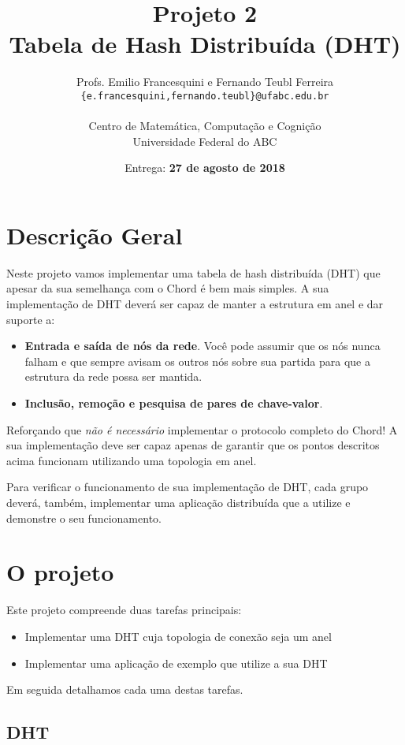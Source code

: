 \documentclass[oneside,12pt,a4paper]{article}
\title{Projeto 2\\ Tabela de Hash Distribuída (DHT)}
\author{Profs. Emilio Francesquini e Fernando Teubl Ferreira\\
  \texttt{\{e.francesquini,fernando.teubl\}@ufabc.edu.br} \\
  \mbox{}\\
  Centro de Matemática, Computação e Cognição\\
  Universidade Federal do ABC}
\date{Entrega: \textbf{27 de agosto de 2018}}
\begin{document}
\maketitle

\section{Descrição Geral}

Neste projeto vamos implementar uma tabela de hash distribuída (DHT)
que apesar da sua semelhança com o Chord é bem mais simples. A sua
implementação de DHT deverá ser capaz de manter a estrutura em anel e
dar suporte a:

\begin{itemize}
\item \textbf{Entrada e saída de nós da rede}. Você pode assumir que
  os nós nunca falham e que sempre avisam os outros nós sobre sua
  partida para que a estrutura da rede possa ser mantida.
\item \textbf{Inclusão, remoção e pesquisa de pares de chave-valor}.
\end{itemize}

Reforçando que \emph{não é necessário} implementar o protocolo
completo do Chord! A sua implementação deve ser capaz apenas de
garantir que os pontos descritos acima funcionam utilizando uma
topologia em anel.

Para verificar o funcionamento de sua implementação de DHT, cada
grupo deverá, também, implementar uma aplicação distribuída que a
utilize e demonstre o seu funcionamento.

\section{O projeto}

Este projeto compreende duas tarefas principais:

\begin{itemize}
\item Implementar uma DHT cuja topologia de conexão seja um anel
\item Implementar uma aplicação de exemplo que utilize a sua DHT
\end{itemize}

Em seguida detalhamos cada uma destas tarefas.

\subsection{DHT}\label{sec:dht}
\end{document}
